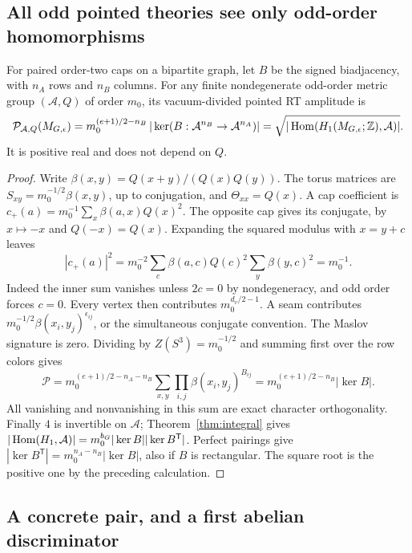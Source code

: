 \subsection{All odd pointed theories see only odd-order homomorphisms}

\begin{theorem}\label{thm:pointed}
For paired order-two caps on a bipartite graph, let \(B\) be the
signed biadjacency, with \(n_A\) rows and \(n_B\) columns.
For any finite nondegenerate odd-order metric group
\((\mathcal A,Q)\) of order \(m_0\), its vacuum-divided pointed RT
amplitude is
\[
 \mathcal P_{\mathcal A,Q}(M_{G,\epsilon})
 =m_0^{(e+1)/2-n_B}\,|\ker(B:\mathcal A^{n_B}\to\mathcal A^{n_A})|
 =\sqrt{|\operatorname{Hom}(H_1(M_{G,\epsilon};\mathbb Z),\mathcal A)|}.
\]
It is positive real and does not depend on \(Q\).
\end{theorem}
\begin{proof}
Write \(\beta(x,y)=Q(x+y)/(Q(x)Q(y))\). The torus matrices are
\(S_{xy}=m_0^{-1/2}\beta(x,y)\), up to conjugation, and
\(\Theta_{xx}=Q(x)\). A cap coefficient is
\(c_+(a)=m_0^{-1}\sum_x\beta(a,x)Q(x)^2\).
The opposite cap gives its conjugate, by \(x\mapsto-x\) and
\(Q(-x)=Q(x)\). Expanding the squared modulus with \(x=y+c\)
leaves
\[
 |c_+(a)|^2=m_0^{-2}\sum_c \beta(a,c)Q(c)^2
                                \sum_y\beta(y,c)^2=m_0^{-1}.
\]
Indeed the inner sum vanishes unless \(2c=0\) by nondegeneracy,
and odd order forces \(c=0\). Every vertex then contributes
\(m_0^{d_v/2-1}\). A seam contributes
\(m_0^{-1/2}\beta(x_i,y_j)^{\epsilon_{ij}}\), or the simultaneous
conjugate convention. The Maslov signature is zero. Dividing by
\(Z(S^3)=m_0^{-1/2}\) and summing first over the row colors gives
\[
  \mathcal P=m_0^{(e+1)/2-n_A-n_B}
    \sum_{x,y}\prod_{i,j}\beta(x_i,y_j)^{B_{ij}}
  =m_0^{(e+1)/2-n_B}|\ker B|.
\]
All vanishing and nonvanishing in this sum are exact character
orthogonality. Finally \(4\) is invertible on \(\mathcal A\);
Theorem~\ref{thm:integral} gives
\(|\operatorname{Hom}(H_1,\mathcal A)|=m_0^{b_G}|\ker B||\ker B^{\mathsf T}|\).
Perfect pairings give \(|\ker B^{\mathsf T}|=
m_0^{n_A-n_B}|\ker B|\), also if \(B\) is rectangular.
The square root is the positive one by the preceding calculation.
\end{proof}

\subsection{A concrete pair, and a first abelian discriminator}

